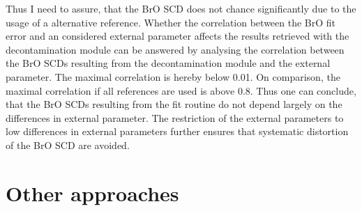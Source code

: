 \documentclass  [
  paper    = a4,
  BCOR     = 10mm,
  twoside,
  fontsize = 12pt,
  fleqn,
  toc      = bibnumbered,
  toc      = listofnumbered,
  numbers  = noendperiod,
  headings = normal,
  listof   = leveldown,
  version  = 3.03
]                                       {scrreprt}
\begin{document}
	Thus I need to assure, that the BrO SCD does not chance significantly due to the usage of a alternative reference.
	Whether the correlation between the BrO fit error and an considered external parameter  affects the results retrieved with the decontamination module can be answered by analysing the correlation between the BrO SCDs resulting from the decontamination module and the external parameter.
	The maximal correlation is hereby below 0.01. 
	On comparison, the maximal correlation if all references are used is above 0.8. Thus one can conclude, that the BrO SCDs resulting from the fit routine do not depend largely on the differences in external parameter. The restriction of the external parameters to low differences in external parameters further ensures that systematic distortion of the BrO SCD are avoided. \\
		
%	
%
%
%
	\section{Other approaches}
\end{document}
